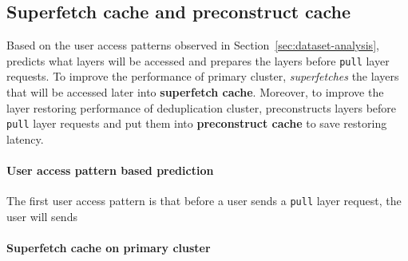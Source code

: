 
\subsection{Superfetch cache and preconstruct cache}
\label{sec:cache-design}


%

Based on the user access patterns observed in Section~\ref{sec:dataset-analysis},
\sysname predicts what layers will be accessed and prepares the layers before \texttt{pull} layer requests.
To improve the performance of primary cluster,
\sysname \emph{superfetches} the layers that will be accessed later into \textbf{superfetch cache}.
Moreover, 
to improve the layer restoring performance of deduplication cluster,
\sysname preconstructs layers before \texttt{pull} layer requests 
and put them into \textbf{preconstruct cache} to save restoring latency.

\paragraph{User access pattern based prediction}
The first user access pattern is that before a user sends a \texttt{pull} layer request,
the user will sends

%

\paragraph{Superfetch cache  on primary cluster} 



